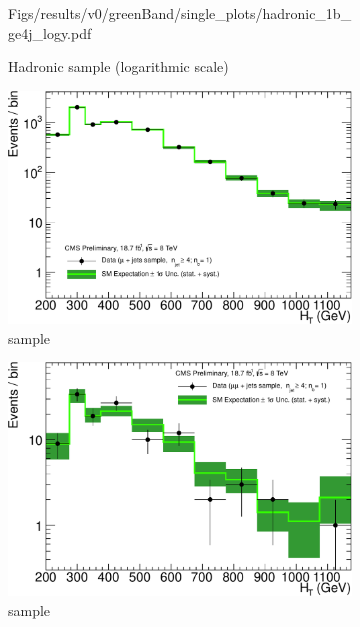 \begin{figure}[h!]
\begin{subfigure}[b]{0.48\textwidth}
    {Figs/results/v0/greenBand/single_plots/hadronic_1b_ge4j_logy.pdf}
    \caption{Hadronic sample (logarithmic scale)}
  \end{subfigure}
  \begin{subfigure}[b]{0.48\textwidth}
    \includegraphics[width=\textwidth]
    {Figs/results/v0/greenBand/single_plots/muon_1b_ge4j_logy.pdf}
    \caption{\mj sample}
  \end{subfigure}
  \begin{subfigure}[b]{0.48\textwidth}
    \includegraphics[width=\textwidth]
    {Figs/results/v0/greenBand/single_plots/mumu_1b_ge4j_logy.pdf}
    \caption{\mmj sample}
  \end{subfigure}\\
  \vspace{0.7cm}\begin{subfigure}[b]{0.48\textwidth}

\end{subfigure}
\end{figure}

